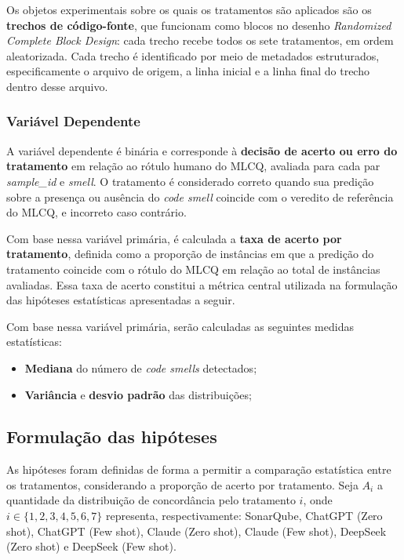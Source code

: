 Os objetos experimentais sobre os quais os tratamentos são aplicados são os \textbf{trechos de código-fonte}, que funcionam como blocos no desenho \textit{Randomized Complete Block Design}: cada trecho recebe todos os sete tratamentos, em ordem aleatorizada. Cada trecho é identificado por meio de metadados estruturados, especificamente o arquivo de origem, a linha inicial e a linha final do trecho dentro desse arquivo.

\subsubsection*{Variável Dependente}
A variável dependente é binária e corresponde à \textbf{decisão de acerto ou erro do tratamento} em relação ao rótulo humano do MLCQ, avaliada para cada par \textit{sample\_id} e \textit{smell}. O tratamento é considerado correto quando sua predição sobre a presença ou ausência do \textit{code smell} coincide com o veredito de referência do MLCQ, e incorreto caso contrário.

Com base nessa variável primária, é calculada a \textbf{taxa de acerto por tratamento}, definida como a proporção de instâncias em que a predição do tratamento coincide com o rótulo do MLCQ em relação ao total de instâncias avaliadas. Essa taxa de acerto constitui a métrica central utilizada na formulação das hipóteses estatísticas apresentadas a seguir.


Com base nessa variável primária, serão calculadas as seguintes medidas estatísticas:

\begin{itemize}
    \item \textbf{Mediana} do número de \textit{code smells} detectados;
    \item \textbf{Variância} e \textbf{desvio padrão} das distribuições;
\end{itemize}

\subsection{Formulação das hipóteses}

As hipóteses foram definidas de forma a permitir a comparação estatística entre os
tratamentos, considerando a proporção de acerto por tratamento. Seja $A_i$ a quantidade da distribuição de concordância pelo
tratamento $i$, onde $i \in \{1,2,3,4,5,6,7\}$ representa, respectivamente:
SonarQube, ChatGPT (Zero shot), ChatGPT (Few shot), Claude (Zero shot), Claude (Few shot), DeepSeek (Zero shot) e DeepSeek (Few shot).


